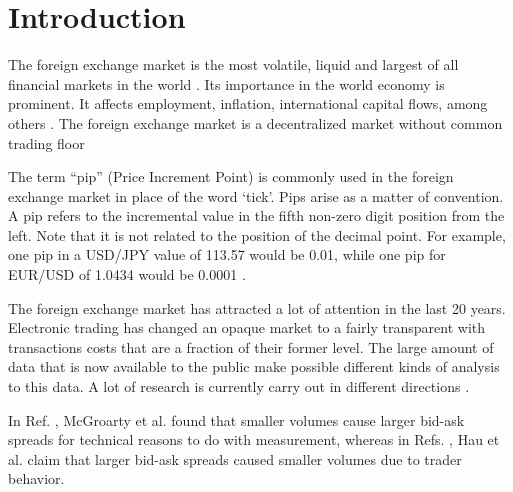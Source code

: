 \section{Introduction}\label{sec:introduction}

The foreign exchange market is the most volatile, liquid and largest of all
financial markets in the world
\cite{forex_liquidity,info_forex,intraday_forex}. Its importance in the world
economy is prominent. It affects employment, inflation, international capital
flows, among others \cite{forex_structure}. The foreign exchange market is a
decentralized market without common trading floor
\cite{teach_spread,forex_structure,info_forex,forex_market_micro}

The term ``pip'' (Price Increment Point) is commonly used in the foreign
exchange market in place of the word ‘tick’. Pips arise as a matter of
convention. A pip refers to the incremental value in the fifth non-zero digit
position from the left. Note that it is not related to the position of the
decimal point. For example, one pip in a USD/JPY value of 113.57 would be 0.01,
while one pip for EUR/USD of 1.0434 would be 0.0001
\cite{order_flow_forex,forex_structure,micro_eff,forex_market_micro}.

The foreign exchange market has attracted a lot of attention in the last 20
years. Electronic trading has changed an opaque market to a fairly transparent
with transactions costs that are a fraction of their former level. The large
amount of data that is now available to the public make possible different
kinds of analysis to this data. A lot of research is currently carry out in
different directions
\cite{curr_speculation,forex_algorithmic,teach_spread,electronic_forex,forex_microstructure,patterns_forex,eur_change_forex,spread_competition,forex_structure,political_forex,forex_liquidity,forex_volatility,info_forex,local_forex,intraday_forex,forex_inefficiency}.

In Ref. \cite{micro_eff}, McGroarty et al. found that smaller volumes cause
larger bid-ask spreads for technical reasons to do with measurement, whereas in
Refs. \cite{eur_int_curr,eur_change_forex}, Hau et al. claim that larger
bid-ask spreads caused smaller volumes due to trader behavior.

